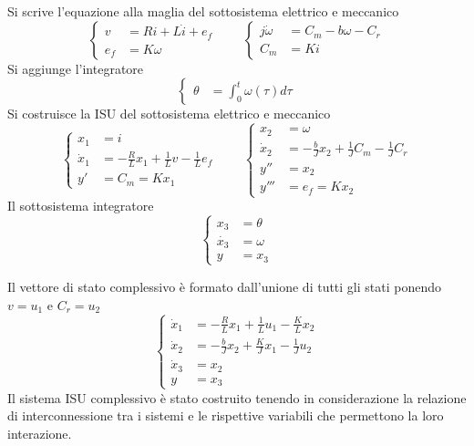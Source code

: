 Si scrive l'equazione alla maglia del sottosistema elettrico e meccanico
$$\left\{\begin{aligned}
v&=Ri+L\dot{i} + e_f \\
e_f &= K\omega
\end{aligned}\right. \qquad
\left\{\begin{aligned}
j\dot\omega &=C_m -b\omega -C_r \\
C_m &= Ki
\end{aligned}\right.
$$
Si aggiunge l'integratore
$$\left\{\begin{aligned}
\theta &= \int_0^t \omega (\tau) d\tau
\end{aligned}\right.
$$
Si costruisce la ISU del sottosistema elettrico e meccanico
$$\left\{\begin{aligned}
x_1 &= i\\
\dot{x}_1 &= -\frac{R}{L}x_1 + \frac{1}{L}v -\frac{1}{L}e_f \\
y' &= C_m = Kx_1
\end{aligned}\right. \qquad
\left\{\begin{aligned}
x_2 &= \omega \\
\dot{x}_2 &= -\frac{b}{J}x_2 + \frac{1}{J}C_m -\frac{1}{J}C_r\\
y'' &= x_2\\
y''' &= e_f = Kx_2
\end{aligned}\right.
$$
Il sottosistema integratore
$$
\left\{\begin{aligned}
 x_3 &= \theta \\
 \dot{x_3} & = \omega \\
 y &= x_3
\end{aligned}\right.
$$

Il vettore di stato complessivo è formato dall'unione di tutti gli stati
ponendo $v=u_1$ e $C_r=u_2$
$$
\left\{\begin{aligned}
\dot{x}_1 &= -\frac{R}{L}x_1 + \frac{1}{L}u_1 - \frac{K}{L}x_2 \\
\dot{x}_2 &= -\frac{b}{J}x_2 +\frac{K}{J}x_1 - \frac{1}{J}u_2\\
\dot{x}_3 & = x_2 \\
y&= x_3
\end{aligned}\right.
$$
Il sistema ISU complessivo è stato costruito tenendo in considerazione la
relazione di interconnessione tra i sistemi e le rispettive variabili che
permettono la loro interazione.
